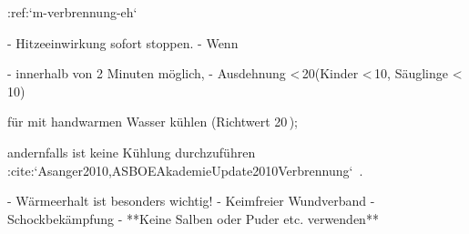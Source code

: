 :ref:`m-verbrennung-eh`
\begin{itemize}
  -   Hitzeeinwirkung sofort stoppen.
  -   Wenn 
  \begin{itemize}
    -   innerhalb von 2 Minuten
  möglich,
    -   Ausdehnung <\,20\PC* (Kinder <\,10\PC, Säuglinge
    <\,10\PC*) 
  \end{itemize}  für  mit
    handwarmen Wasser kühlen (Richtwert 20\,\DegC); 
    
    andernfalls ist keine Kühlung durchzuführen
 :cite:`Asanger2010,ASBOEAkademieUpdate2010Verbrennung`\ .
  
  -   Wärmeerhalt ist besonders wichtig!
  -   Keimfreier Wundverband
  -   Schockbekämpfung
  -   **Keine Salben oder Puder etc. verwenden**
\end{itemize}